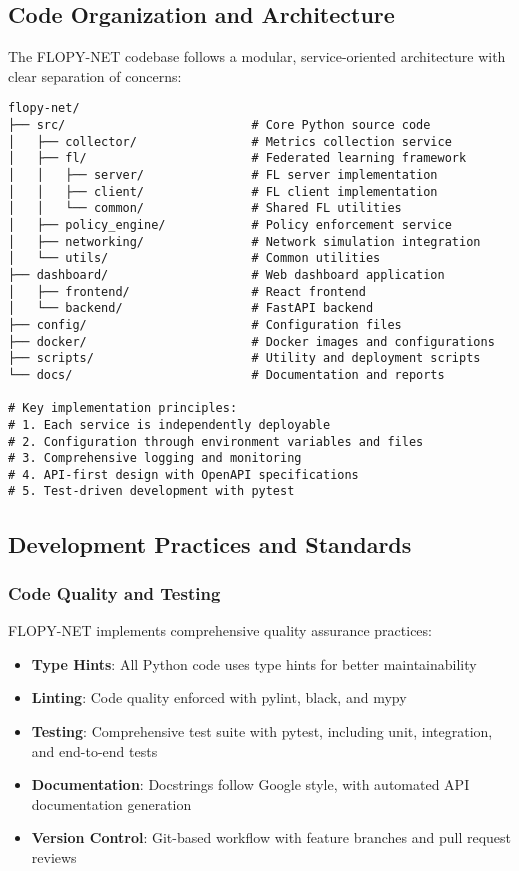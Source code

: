\subsection{Code Organization and Architecture}

The FLOPY-NET codebase follows a modular, service-oriented architecture with clear separation of concerns:

\begin{lstlisting}[style=pythoncode, caption=Project Structure Overview]
flopy-net/
├── src/                          # Core Python source code
│   ├── collector/                # Metrics collection service
│   ├── fl/                       # Federated learning framework
│   │   ├── server/               # FL server implementation
│   │   ├── client/               # FL client implementation
│   │   └── common/               # Shared FL utilities
│   ├── policy_engine/            # Policy enforcement service
│   ├── networking/               # Network simulation integration
│   └── utils/                    # Common utilities
├── dashboard/                    # Web dashboard application
│   ├── frontend/                 # React frontend
│   └── backend/                  # FastAPI backend
├── config/                       # Configuration files
├── docker/                       # Docker images and configurations
├── scripts/                      # Utility and deployment scripts
└── docs/                         # Documentation and reports

# Key implementation principles:
# 1. Each service is independently deployable
# 2. Configuration through environment variables and files
# 3. Comprehensive logging and monitoring
# 4. API-first design with OpenAPI specifications
# 5. Test-driven development with pytest
\end{lstlisting}

\subsection{Development Practices and Standards}

\subsubsection{Code Quality and Testing}

FLOPY-NET implements comprehensive quality assurance practices:

\begin{itemize}
    \item \textbf{Type Hints}: All Python code uses type hints for better maintainability
    \item \textbf{Linting}: Code quality enforced with pylint, black, and mypy
    \item \textbf{Testing}: Comprehensive test suite with pytest, including unit, integration, and end-to-end tests
    \item \textbf{Documentation}: Docstrings follow Google style, with automated API documentation generation
    \item \textbf{Version Control}: Git-based workflow with feature branches and pull request reviews
\end{itemize}


